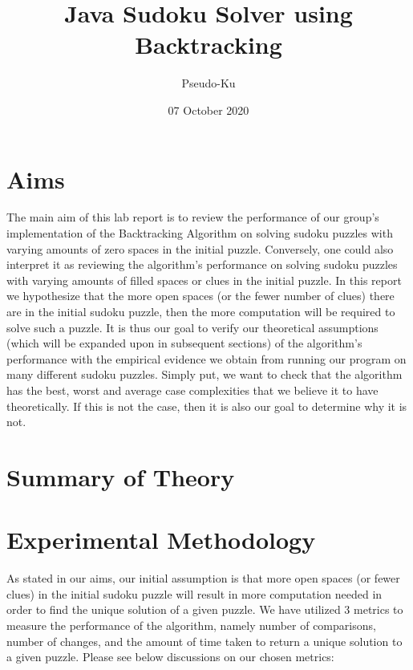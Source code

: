 \documentclass{article}
\author{Pseudo-Ku}
\title{Java Sudoku Solver using Backtracking}
\date{07 October 2020}
\begin{document}
    \begin{titlepage}
        \maketitle{}
    \end{titlepage}
    
    \tableofcontents

    \pagebreak 
    \section{Aims}
    The main aim of this lab report is to review the performance of our group’s implementation of the Backtracking Algorithm on solving sudoku puzzles with varying amounts of zero spaces in the initial puzzle. Conversely, one could also interpret it as reviewing the algorithm’s performance on solving sudoku puzzles with varying amounts of filled spaces or clues in the initial puzzle. In this report we hypothesize that the more open spaces (or the fewer number of clues) there are in the initial sudoku puzzle, then the more computation will be required to solve such a puzzle. 
    It is thus our goal to verify our theoretical assumptions (which will be expanded upon in subsequent sections) of the algorithm’s performance with the empirical evidence we obtain from running our program on many different sudoku puzzles. Simply put, we want to check that the algorithm has the best, worst and average case complexities that we believe it to have theoretically. If this is not the case, then it is also our goal to determine why it is not.

    \section{Summary of Theory}

    \pagebreak 
    \section{Experimental Methodology}
    As stated in our aims, our initial assumption is that more open spaces (or fewer clues) in the initial sudoku puzzle will result in more computation needed in order to find the unique solution of a given puzzle. We have utilized 3 metrics to measure the performance of the algorithm, namely number of comparisons, number of changes, and the amount of time taken to return a unique solution to a given puzzle. Please see below discussions on our chosen metrics:
\end{document}
